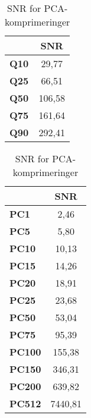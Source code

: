 \begin{table}[htpb]
\begin{minipage}[b]{0.45\textwidth}
\centering
\begin{tabular}{|l|c|}
\hline
      & \textbf{SNR} \\ \hline
\textbf{Q10}   & 29,77                    \\ \hline
\textbf{Q25}   & 66,51                    \\ \hline
\textbf{Q50}   & 106,58                   \\ \hline
\textbf{Q75}   & 161,64                   \\ \hline
\textbf{Q90}   & 292,41                   \\ \hline
\end{tabular}
\caption{SNR for DCT-komprimeringer}
\label{tb:SNR_DCT}
\end{minipage}
\hspace{0.5cm}
\begin{minipage}[b]{0.45\linewidth}
\centering
\begin{tabular}{|l|c|}
\hline
& \textbf{SNR} \\ \hline
\textbf{PC1}	 & 2,46 \\ \hline
\textbf{PC5}	 & 5,80 \\ \hline
\textbf{PC10} & 10,13 \\ \hline
\textbf{PC15} & 14,26 \\ \hline
\textbf{PC20} & 18,91 \\ \hline
\textbf{PC25} & 23,68 \\ \hline
\textbf{PC50} & 53,04 \\ \hline
\textbf{PC75} & 95,39 \\ \hline
\textbf{PC100}& 155,38 \\ \hline
\textbf{PC150}& 346,31 \\ \hline
\textbf{PC200}& 639,82 \\ \hline
\textbf{PC512}& 7440,81 \\ \hline
\end{tabular}
\caption{SNR for PCA-komprimeringer}
\label{tb:SNR_PCA}
\end{minipage}
\end{table}


%


